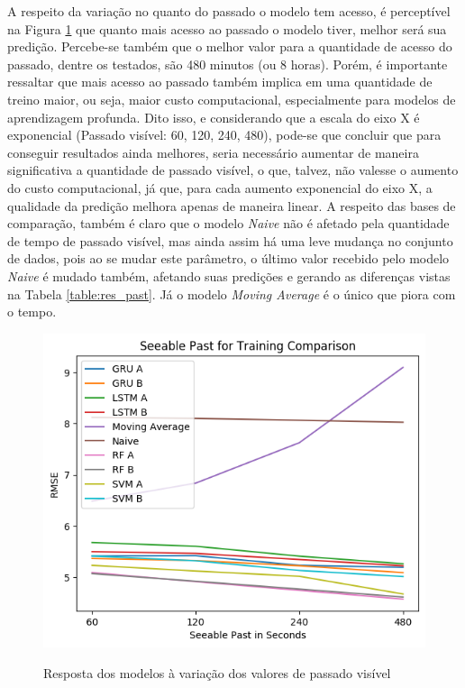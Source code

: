 
A respeito da variação no quanto do passado o modelo tem acesso, é perceptível na Figura \ref{figure:res_past} que quanto mais acesso ao passado o modelo tiver, melhor será sua predição. Percebe-se também que o melhor valor para a quantidade de acesso do passado, dentre os testados, são 480 minutos (ou 8 horas). Porém, é importante ressaltar que mais acesso ao passado também implica em uma quantidade de treino maior, ou seja, maior custo computacional, especialmente para modelos de aprendizagem profunda. Dito isso, e considerando que a escala do eixo X é exponencial (Passado visível: 60, 120, 240, 480), pode-se que concluir que para conseguir resultados ainda melhores, seria necessário aumentar de maneira significativa a quantidade de passado visível, o que, talvez, não valesse o aumento do custo computacional, já que, para cada aumento exponencial do eixo X, a qualidade da predição melhora apenas de maneira linear. A respeito das bases de comparação, também é claro que o modelo \textit{Naive} não é afetado pela quantidade de tempo de passado visível, mas ainda assim há uma leve mudança no conjunto de dados, pois ao se mudar este parâmetro, o último valor recebido pelo modelo \textit{Naive} é mudado também, afetando suas predições e gerando as diferenças vistas na Tabela \ref{table:res_past}. Já o modelo \textit{Moving Average} é o único que piora com o tempo. 


\begin{figure}[htbp]
    \centering
    \includegraphics[scale=0.8]{monography/img/seeable_past_for_training_comparison_rmse.png}
    \label{figure:res_past}
    \caption[Resposta dos modelos à variação dos valores de passado visível]{Resposta dos modelos à variação dos valores de passado visível}
\end{figure}
 
